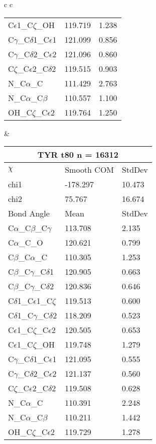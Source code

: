\begin{longtable}{ c c }
\begin{tabular}{ l l l }
  C$\epsilon$1\_C$\zeta$\_OH & 119.719 & 1.238\\
  C$\gamma$\_C$\delta$1\_C$\epsilon$1 & 121.099 & 0.856\\
  C$\gamma$\_C$\delta$2\_C$\epsilon$2 & 121.096 & 0.860\\
  C$\zeta$\_C$\epsilon$2\_C$\delta$2 & 119.515 & 0.903\\
  N\_C$\alpha$\_C & 111.429 & 2.763\\
  N\_C$\alpha$\_C$\beta$ & 110.557 & 1.100\\
  OH\_C$\zeta$\_C$\epsilon$2 & 119.764 & 1.250\\
  \bottomrule
  \end{tabular}
  &
  \begin{tabular}{ l l l }
  \toprule
  \multicolumn{3}{c}{TYR \textbf{t80} n = 16312} \\ \toprule
  $\chi$       & Smooth COM & StdDev \\ \midrule
  chi1 & -178.297 & 10.473 \\ 
  chi2 & 75.767 & 16.674 \\ \midrule
  Bond Angle   & Mean     & StdDev \\ \midrule
  C$\alpha$\_C$\beta$\_C$\gamma$ & 113.708 & 2.135\\
  C$\alpha$\_C\_O & 120.621 & 0.799\\
  C$\beta$\_C$\alpha$\_C & 110.305 & 1.253\\
  C$\beta$\_C$\gamma$\_C$\delta$1 & 120.905 & 0.663\\
  C$\beta$\_C$\gamma$\_C$\delta$2 & 120.836 & 0.646\\
  C$\delta$1\_C$\epsilon$1\_C$\zeta$ & 119.513 & 0.600\\
  C$\delta$1\_C$\gamma$\_C$\delta$2 & 118.209 & 0.523\\
  C$\epsilon$1\_C$\zeta$\_C$\epsilon$2 & 120.505 & 0.653\\
  C$\epsilon$1\_C$\zeta$\_OH & 119.748 & 1.279\\
  C$\gamma$\_C$\delta$1\_C$\epsilon$1 & 121.095 & 0.555\\
  C$\gamma$\_C$\delta$2\_C$\epsilon$2 & 121.137 & 0.560\\
  C$\zeta$\_C$\epsilon$2\_C$\delta$2 & 119.508 & 0.628\\
  N\_C$\alpha$\_C & 110.391 & 2.248\\
  N\_C$\alpha$\_C$\beta$ & 110.211 & 1.442\\
  OH\_C$\zeta$\_C$\epsilon$2 & 119.729 & 1.278\\
  \bottomrule
  \end{tabular}
  \\
  
\end{longtable}    

